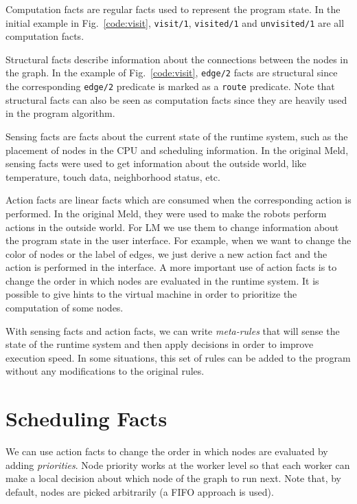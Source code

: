 Computation facts are regular facts used to represent the program state. In the initial
example in Fig.~\ref{code:visit}, \texttt{visit/1}, \texttt{visited/1} and \texttt{unvisited/1}
are all computation facts.

Structural facts describe information about the connections between the nodes in the graph.
In the example of Fig.~\ref{code:visit}, \texttt{edge/2} facts are structural since the
corresponding \texttt{edge/2} predicate is
marked as a \texttt{route} predicate. Note that structural facts can also be seen as
computation facts since they are heavily used in the program algorithm.

Sensing facts are facts about the current state of the runtime system, such as the placement
of nodes in the CPU and scheduling information. In the original Meld, sensing facts
were used to get information about the outside world, like temperature, touch data,
neighborhood status, etc.

Action facts are linear facts which are consumed when the corresponding action is performed.
In the original Meld, they were used to make the robots perform actions in the outside world.
For LM we use them to change information about the program state
in the user interface. For example, when we want to change the color of nodes or the label
of edges, we just derive a new action fact and the action is performed in the interface.
A more important use of action facts is to change the order in which nodes
are evaluated in the runtime system. It is possible to give hints to the virtual
machine in order to prioritize the computation of some nodes.

With sensing facts and action facts, we can write \emph{meta-rules} that will sense the
state of the runtime system and then apply decisions in order to improve execution speed.
In some situations, this set of rules can be added to the program without any modifications
to the original rules.


\section{Scheduling Facts}

We can use action facts to change the order in which nodes are evaluated by adding
\emph{priorities}. Node priority works at the worker level
so that each worker can make a local decision about which node of the graph to run next.
Note that, by default, nodes are picked arbitrarily (a FIFO approach is used).

